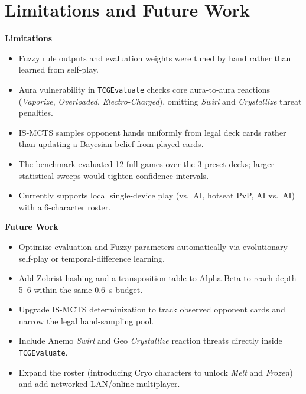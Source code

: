 \documentclass[11pt,a4paper]{article}
\begin{document}
\section{Limitations and Future Work}

\noindent
\begin{minipage}[t]{0.475\textwidth}
\textbf{Limitations}
\begin{itemize}[leftmargin=1.2em, itemsep=0pt, topsep=1pt]
  \item Fuzzy rule outputs and evaluation weights were tuned by hand rather than learned from self-play.
  \item Aura vulnerability in \texttt{TCGEvaluate} checks core aura-to-aura reactions (\emph{Vaporize}, \emph{Overloaded}, \emph{Electro-Charged}), omitting \emph{Swirl} and \emph{Crystallize} threat penalties.
  \item IS-MCTS samples opponent hands uniformly from legal deck cards rather than updating a Bayesian belief from played cards.
  \item The benchmark evaluated 12 full games over the 3 preset decks; larger statistical sweeps would tighten confidence intervals.
  \item Currently supports local single-device play (vs.\ AI, hotseat PvP, AI vs.\ AI) with a 6-character roster.
\end{itemize}
\end{minipage}\hfill
\begin{minipage}[t]{0.475\textwidth}
\textbf{Future Work}
\begin{itemize}[leftmargin=1.2em, itemsep=0pt, topsep=1pt]
  \item Optimize evaluation and Fuzzy parameters automatically via evolutionary self-play or temporal-difference learning.
  \item Add Zobrist hashing and a transposition table to Alpha-Beta to reach depth 5--6 within the same 0.6~s budget.
  \item Upgrade IS-MCTS determinization to track observed opponent cards and narrow the legal hand-sampling pool.
  \item Include Anemo \emph{Swirl} and Geo \emph{Crystallize} reaction threats directly inside \texttt{TCGEvaluate}.
  \item Expand the roster (introducing Cryo characters to unlock \emph{Melt} and \emph{Frozen}) and add networked LAN/online multiplayer.
\end{itemize}
\end{minipage}
\end{document}
